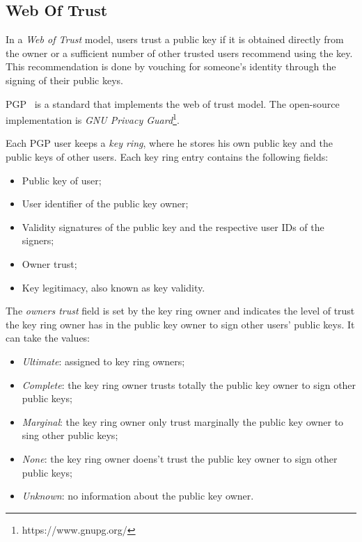 \subsection{Web Of Trust}

In a \textit{Web of Trust}\cite{Caronni2000} model, users trust a public key if it is obtained directly from the owner or a sufficient number of other trusted users recommend using the key.
This recommendation is done by vouching for someone's identity through the signing of their public keys.

\ac{PGP}~\cite{rfc4880} is a standard that implements the web of trust model.
The open-source implementation is \textit{GNU Privacy Guard}\footnote{https://www.gnupg.org/}.

Each \ac{PGP} user keeps a \textit{key ring}, where he stores his own public key and the public keys of other users.
Each key ring entry contains the following fields:
\begin{itemize}
	\item Public key of user;
	\item User identifier of the public key owner;
	\item Validity signatures of the public key and the respective user IDs of the signers;
	\item Owner trust;
	\item Key legitimacy, also known as key validity.
\end{itemize}

The \textit{owners trust} field is set by the key ring owner and indicates the level of trust the key ring owner has in the public key owner to sign other users' public keys.
It can take the values:

\begin{itemize}
	\item \textit{Ultimate}: assigned to key ring owners;
	\item \textit{Complete}: the key ring owner trusts totally the public key owner to sign other public keys;
	\item \textit{Marginal}: the key ring owner only trust marginally the public key owner to sing other public keys;
	\item \textit{None}: the key ring owner doens't trust the public key owner to sign other public keys;
	\item \textit{Unknown}: no information about the public key owner.
\end{itemize}

